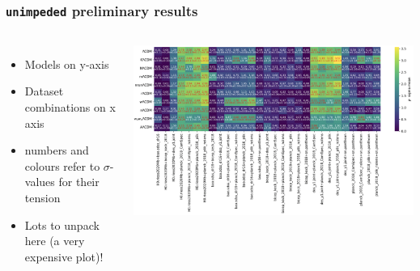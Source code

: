 \documentclass[aspectratio=169]{beamer}
\begin{document}
\begin{frame}
    \frametitle{\texttt{unimpeded} preliminary results}
    \begin{columns}
        \begin{itemize}
            \item Models on y-axis
            \item Dataset combinations on x axis
            \item numbers and colours refer to $\sigma$-values for their tension
            \item Lots to unpack here (a very expensive plot)!
        \end{itemize}
        \includegraphics[width=\textwidth]{figures/sigma.png}
    \end{columns}
\end{frame}
\end{document}
